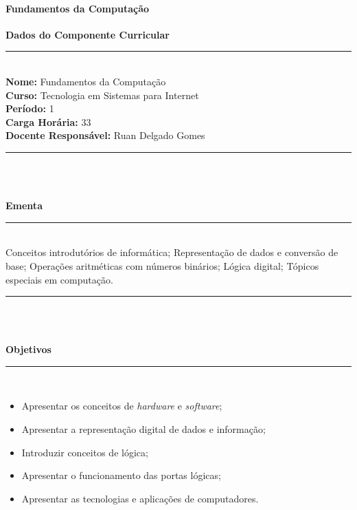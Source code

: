 \paragraph{Fundamentos da Computa\c{c}\~ao}

\begin{center}\textbf{Dados do Componente Curricular}\end{center}
\vspace{-5mm}
\noindent\rule{16.5cm}{0.4pt}
\\
\textbf{Nome:} Fundamentos da Computa\c{c}\~ao
\\ 
\textbf{Curso:} Tecnologia em Sistemas para Internet
\\ 
\textbf{Período:} \unit{1}{\degree}
\\ 
\textbf{Carga Horária:} \unit{33}{\hour}
\\ 
\textbf{Docente Responsável:} Ruan Delgado Gomes
\\ 
\noindent\rule{16.5cm}{0.4pt}\\
\\
\vspace{-12mm}
\begin{center}\textbf{Ementa}\end{center}
\vspace{-5mm}
\noindent\rule{16.5cm}{0.4pt}
\\
Conceitos introdut\'orios de inform\'atica; Representa\c{c}\~ao de dados e convers\~ao de base; Opera\c{c}\~oes aritm\'eticas com n\'umeros bin\'arios; L\'ogica digital; T\'opicos especiais em computa\c{c}\~ao.\\
\noindent\rule{16.5cm}{0.4pt}\\
\\
\vspace{-12mm}
\begin{center}\textbf{Objetivos}\end{center}
\vspace{-5mm}
\noindent\rule{16.5cm}{0.4pt}
\\
\begin{itemize}
\item Apresentar os conceitos de \textit{hardware} e \textit{software};
\item Apresentar a representação digital de dados e informação;
\item Introduzir conceitos de l\'ogica;
\item Apresentar o funcionamento das portas lógicas;
\item Apresentar as tecnologias e aplicações de computadores.
\end{itemize} 
